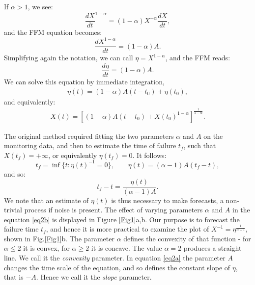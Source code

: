 \documentclass{article}
\begin{document}
If $\alpha > 1$, we see:
$$\frac{dX}{dt}^{1-\alpha}=(1-\alpha)X^{-\alpha}\frac{dX}{dt},$$
and the FFM equation becomes:
$$\frac{dX^{1-\alpha}}{dt}=(1-\alpha)A.$$
Simplifying again the notation, we can call $\eta=X^{1-\alpha}$, and the FFM reads:
$$\frac{d\eta}{dt}=(1-\alpha)A.$$
We can solve this equation by immediate integration,
\begin{align}\label{eq2a}
\eta(t)=(1-\alpha)A(t-t_0)+\eta(t_0),
\end{align}
and equivalently:
\begin{align}\label{eq2b}
X(t)=\left[(1-\alpha)A(t-t_0)+X(t_0)^{1-\alpha}\right]^{\frac{1}{1-\alpha}}.
\end{align}

The original method required fitting the two parameters $\alpha$ and $A$ on the monitoring data, and then to estimate the time of failure $t_f$, such that $X(t_f) =+\infty$, or equivalently $\eta(t_f)=0$. It follows:
$$t_f=\inf\{t:\eta(t)^{-1}=0\}, \quad\quad \eta(t)=(\alpha-1)A(t_f-t),$$
and so:
$$t_f-t=\frac{\eta(t)}{(\alpha-1)A}.$$
We note that an estimate of $\eta(t)$ is thus necessary to make forecasts, a non-trivial process if noise is present. The effect of varying parameters $\alpha$ and $A$ in the equation \ref{eq2b} is displayed in Figure \ref{Fig1}a,b. Our purpose is to forecast the failure time $t_f$, and hence it is more practical to examine the plot of $X^{-1}=\eta^{\frac{1}{\alpha-1}}$, shown in Fig.\ref{Fig1}b. The parameter $\alpha$ defines the convexity of that function - for $\alpha\le2$ it is convex, for $\alpha\ge2$ it is concave. The value $\alpha=2$ produces a straight line. We call it the {\it convexity} parameter. In equation \ref{eq2a} the parameter $A$ changes the time scale of the equation, and so defines the constant slope of $\eta$, that is $-A$. Hence we call it the {\it slope} parameter.
\end{document}
